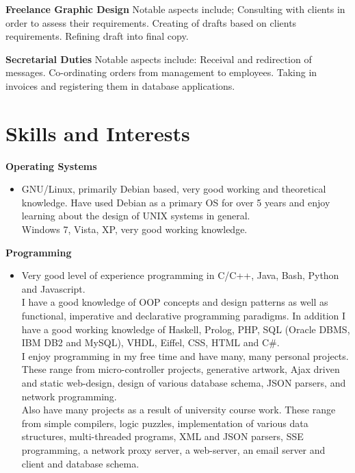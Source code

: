 \documentclass{res}
\begin{document}
\begin{resume}
    {\bf Freelance Graphic Design} Notable aspects include; Consulting with clients in order to assess their requirements. Creating of drafts based on clients requirements. Refining draft into final copy.
 
    {\bf Secretarial Duties} Notable aspects include: Receival and redirection of messages. Co-ordinating orders from management to employees. Taking in invoices and registering them in database applications.

 
   
 


     
\section{Skills and Interests} 
\vspace{0.1in}
 {\bf Operating Systems}
    \begin{itemize} %
      \item[] GNU/Linux, primarily Debian based, very good working and theoretical knowledge. Have used Debian as a primary OS for over 5 years and enjoy learning about the design of UNIX systems in general.\\
        Windows 7, Vista, XP, very good working knowledge.
      \end{itemize}
{\bf Programming} 
       \begin{itemize}
        \item[] Very good level of experience programming in C/C++, Java, Bash, Python and Javascript.\\
        I have a good knowledge of OOP concepts and design patterns as well as functional, imperative and declarative programming paradigms.  
        In addition I have a good working knowledge of Haskell, Prolog, PHP, SQL (Oracle DBMS, IBM DB2 and MySQL), VHDL, Eiffel, CSS, HTML and C\#.\\
        I enjoy programming in my free time and have many, many personal projects. These range from micro-controller projects, generative artwork, Ajax driven and static web-design, design of various database schema, JSON parsers, and network programming.\\
        Also have many projects as a result of university course work. These range from simple compilers, logic puzzles, implementation of various data structures, multi-threaded programs, XML and JSON parsers, SSE programming, a network proxy server, a web-server, an email server and client and database schema.
    \end{itemize}


\end{resume}
\end{document}
